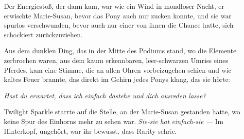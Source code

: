 Der Energiestoß, der dann kam, war wie ein Wind in mondloser Nacht, er erwischte Marie-Susan, bevor das Pony auch nur zucken konnte, und sie war spurlos verschwunden, bevor auch nur einer von ihnen die Chance hatte, sich schockiert zurückzuziehen.

Aus dem dunklen Ding, das in der Mitte des Podiums stand, wo die Elemente zerbrochen waren, aus dem kaum erkennbaren, leer-schwarzen Umriss eines Pferdes, kam eine Stimme, die an allen Ohren vorbeizugehen schien und wie kaltes Feuer brannte, das direkt im Gehirn jedes Ponys klang, das sie hörte:

\emph{Hast du erwartet, dass ich einfach dastehe und dich ausreden lasse?}

Twilight Sparkle starrte auf die Stelle, an der Marie-Susan gestanden hatte, wo keine Spur des Einhorns mehr zu sehen war. \emph{Sie-sie hat einfach-sie —} Im Hinterkopf, ungehört, war ihr bewusst, dass Rarity schrie.

